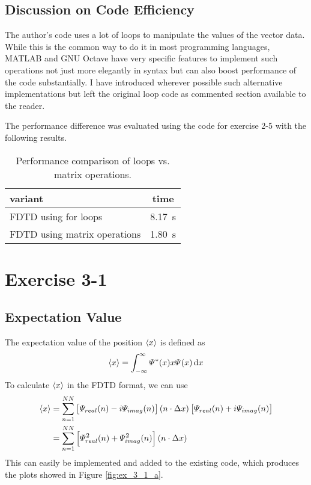 \clearpage





\subsection{Discussion on Code Efficiency}
The author's code uses a lot of loops to manipulate the values of the vector
data. While this is the common way to do it in most programming languages,
MATLAB and GNU Octave have very specific features to implement such operations
not just more elegantly in syntax but can also boost performance of the code
substantially. I have introduced wherever possible such alternative
implementations but left the original loop code as commented section available
to the reader.

The performance difference was evaluated using the code for exercise 2-5 with
the following results.

\begin{table}[h!]
	\centering
	\caption{Performance comparison of loops vs. matrix operations.}
	\begin{tabular}{l c}
		\hline
		variant			& time									\\
		\hline
		FDTD using for loops 			& \SI{8.17}{\second} 	\\
		FDTD using matrix operations 	& \SI{1.80}{\second}	\\
		\hline
	\end{tabular}
\end{table}


\newpage
\section{Exercise 3-1}

\subsection{Expectation Value}

The expectation value of the position $\braket{x}$ is defined as
\[
	\braket{x} = \int_{-\infty}^{\infty} \varPsi^{\ast}(x) x \varPsi(x) \dif x
\]
To calculate $\braket{x}$ in the FDTD format, we can use
\begin{align*}
	\braket{x} &= \sum_{n=1}^{NN} \left[ \varPsi_{real}(n) - i \varPsi_{imag}(n) \right] (n \cdot \Delta x) \left[ \varPsi_{real}(n) + i \varPsi_{imag}(n) \right] \\
	&= \sum_{n=1}^{NN} \left[ \varPsi^2_{real}(n) + \varPsi^2_{imag}(n) \right] (n \cdot \Delta x)
\end{align*}
This can easily be implemented and added to the existing code, which produces
the plots showed in Figure \ref{fig:ex_3_1_a}.


